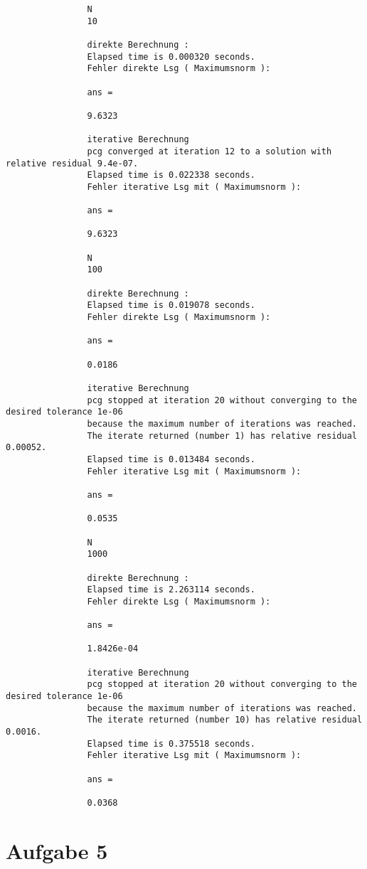 \documentclass[11pt,titlepage]{article}
\begin{document}
			\begin{lstlisting}
				N
				10
				
				direkte Berechnung :
				Elapsed time is 0.000320 seconds.
				Fehler direkte Lsg ( Maximumsnorm ):
				
				ans =
				
				9.6323
				
				iterative Berechnung 
				pcg converged at iteration 12 to a solution with relative residual 9.4e-07.
				Elapsed time is 0.022338 seconds.
				Fehler iterative Lsg mit ( Maximumsnorm ):
				
				ans =
				
				9.6323
				
				N
				100
				
				direkte Berechnung :
				Elapsed time is 0.019078 seconds.
				Fehler direkte Lsg ( Maximumsnorm ):
				
				ans =
				
				0.0186
				
				iterative Berechnung 
				pcg stopped at iteration 20 without converging to the desired tolerance 1e-06
				because the maximum number of iterations was reached.
				The iterate returned (number 1) has relative residual 0.00052.
				Elapsed time is 0.013484 seconds.
				Fehler iterative Lsg mit ( Maximumsnorm ):
				
				ans =
				
				0.0535
				
				N
				1000
				
				direkte Berechnung :
				Elapsed time is 2.263114 seconds.
				Fehler direkte Lsg ( Maximumsnorm ):
				
				ans =
				
				1.8426e-04
				
				iterative Berechnung 
				pcg stopped at iteration 20 without converging to the desired tolerance 1e-06
				because the maximum number of iterations was reached.
				The iterate returned (number 10) has relative residual 0.0016.
				Elapsed time is 0.375518 seconds.
				Fehler iterative Lsg mit ( Maximumsnorm ):
				
				ans =
				
				0.0368
			\end{lstlisting}
			
			
\newpage			
	\section{Aufgabe 5}
	
\end{document}

